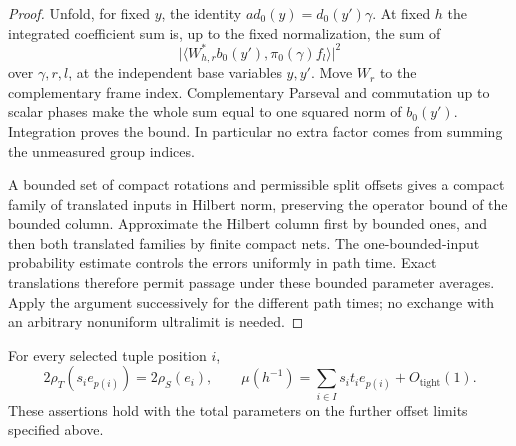 \begin{proof}
Unfold, for fixed $y$, the identity
$a d_0(y)=d_0(y')\gamma$.  At fixed $h$ the integrated coefficient sum is,
up to the fixed normalization, the sum of
\[
 \big|\langle W_{h,r}^*b_0(y'),\pi_0(\gamma)f_l\rangle\big|^2
\]
over $\gamma,r,l$, at the independent base variables $y,y'$.  Move $W_r$
to the complementary frame index.  Complementary Parseval and commutation
up to scalar phases make the whole sum equal to one squared norm of
$b_0(y')$.  Integration proves the bound.  In particular no extra factor
comes from summing the unmeasured group indices.

A bounded set of compact rotations and permissible split offsets gives a
compact family of translated inputs in Hilbert norm, preserving the
operator bound of the bounded column.  Approximate the Hilbert column
first by bounded ones, and then both translated families by finite compact
nets.  The one-bounded-input probability estimate controls the errors
uniformly in path time.  Exact translations therefore permit passage
under these bounded parameter averages.  Apply the argument successively
for the different path times; no exchange with an arbitrary nonuniform
ultralimit is needed.
\end{proof}

\begin{proposition}\label{prop:heights-tuple-calibration}
For every selected tuple position $i$,
\begin{equation}\label{eq:input-16}
 2\rho_T(s_i e_{p(i)})=2\rho_S(e_i),\qquad
 \mu(h^{-1})=\sum_{i\in I}s_it_i e_{p(i)}+O_{\mathrm{tight}}(1).
\end{equation}
These assertions hold with the total parameters on the further offset
limits specified above.
\end{proposition}

